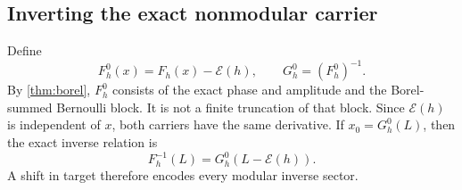\documentclass[11pt,a4paper]{article}
\theoremstyle{definition}
\theoremstyle{remark}
\newcommand{\Ecal}{\mathcal E}
\begin{document}
\subsection{Inverting the exact nonmodular carrier}
Define
\begin{equation}
 F_h^0(x)=F_h(x)-\Ecal(h),\qquad G_h^0=(F_h^0)^{-1}.
 \label{eq:carrier}
\end{equation}
By \cref{thm:borel}, $F_h^0$ consists of the exact phase and amplitude and
the Borel-summed Bernoulli block. It is not a finite truncation of that
block. Since $\Ecal(h)$ is independent of $x$, both carriers have the
same derivative. If $x_0=G_h^0(L)$, then the exact inverse relation is
\begin{equation}
 F_h^{-1}(L)=G_h^0(L-\Ecal(h)).
 \label{eq:inverseexact}
\end{equation}
A shift in target therefore encodes every modular inverse sector.
\end{document}
